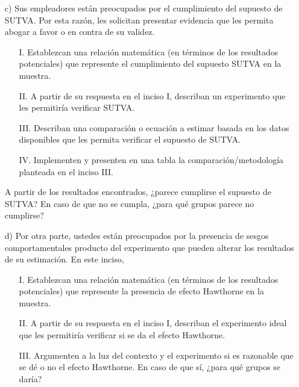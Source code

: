 \documentclass[a4paper]{article}
\begin{document}
\begin{itemize}
    
    \item[c)] Sus empleadores están preocupados por el cumplimiento del supuesto de SUTVA. Por esta razón, les solicitan presentar evidencia que les permita abogar a favor o en contra de su validez. 
    \begin{itemize}
        \item[I.] Establezcan una relación matemática (en términos de los resultados potenciales) que represente el cumplimiento del supuesto SUTVA en la muestra.
        \item[II.] A partir de su respuesta en el inciso I, describan un experimento que les permitiría verificar SUTVA.
        \item[III.] Describan una comparación o ecuación a estimar basada en los datos disponibles que les permita verificar el supuesto de SUTVA.
        \item[IV.] Implementen y presenten en una tabla la comparación/metodología planteada en el inciso III.
    \end{itemize}
    A partir de los resultados encontrados, ¿parece cumplirse el supuesto de SUTVA? En caso de que no se cumpla, ¿para qué grupos parece no cumplirse?\\
    
      \item[d)] Por otra parte, ustedes están preocupados por la presencia de sesgos comportamentales producto del experimento que pueden alterar los resultados de su estimación. En este inciso,
    \begin{itemize}
        \item[I.] Establezcan una relación matemática (en términos de los resultados potenciales) que represente la presencia de efecto Hawthorne en la muestra.
        \item[II.] A partir de su respuesta en el inciso I, describan el experimento ideal que les permitiría verificar si se da el efecto Hawthorne.    
        \item[III.] Argumenten a la luz del contexto y el experimento si es razonable que se dé o no el efecto Hawthorne. En caso de que sí, ¿para qué grupos se daría?\\
    \end{itemize}
    
    
    

\end{itemize}
\end{document}
